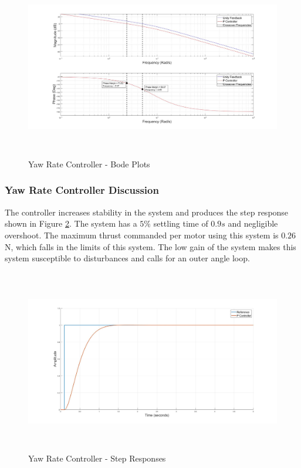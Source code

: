 	\begin{figure}[H]
		\centering
		\includegraphics[height = 8cm]{../Design/Matlab/Controllers/yaw_rate_bode.jpg}
		\caption{Yaw Rate Controller -  Bode Plots}
		\label{IM_YawRateControlBode}
	\end{figure}
	
		\subsubsection{Yaw Rate Controller Discussion}
		The controller increases stability in the system and produces the step response shown in Figure \ref{IM_YawRateStep}. The system has a $5\% $ settling time of $0.9s$ and negligible overshoot. The maximum thrust commanded per motor using this system is $0.26$\,N, which falls in the limits of this system. The low gain of the system makes this system susceptible to disturbances and calls for an outer angle loop. 
					
		\begin{figure}[H]
			\centering
			\includegraphics[height = 8cm]{../Design/Matlab/Controllers/yaw_rate_step.jpg}
			\caption{Yaw Rate Controller -  Step Responses}
			\label{IM_YawRateStep}
		\end{figure}
		
